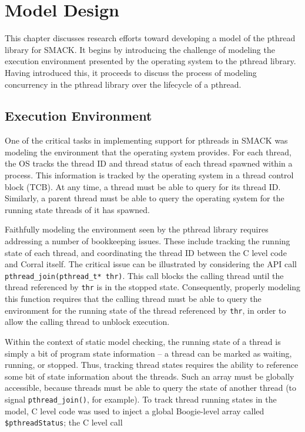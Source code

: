 \chapter{Model Design}\label{ch:modeldesign}
This chapter discusses research efforts toward developing a model of
the pthread library for SMACK.  It begins by introducing the challenge
of modeling the execution environment presented by the operating 
system to the pthread library.  Having introduced this, it proceeds to
discuss the process of modeling concurrency in the pthread library
over the lifecycle of a pthread. 

\section{Execution Environment}\label{sec:executionenvironment}
One of the critical tasks in implementing support for pthreads in
SMACK was modeling the environment that the operating system provides.
For each thread, the OS tracks the thread ID and thread status of
each thread spawned within a process.  This information is tracked by
the operating system in a thread control block (TCB).  At any time, a
thread must be able to query for its thread ID.  Similarly, a 
parent thread must be able to query the operating system for the
running state threads of it has spawned.

Faithfully modeling the environment seen by the pthread library
requires addressing a number of bookkeeping issues.  These include
tracking the running state of each thread, and coordinating the thread
ID between the C level code and Corral itself.  The critical issue can
be illustrated by considering the API call
\lstinline|pthread_join(pthread_t* thr)|. This call blocks the calling
thread until the thread referenced by \lstinline|thr| is in the stopped
state.  Consequently, properly modeling this function requires that the
calling thread must be able to query the environment for the running
state of the thread referenced by \lstinline|thr|, in order to allow
the calling thread to unblock execution.

Within the context of static model checking, the running state of a
thread is simply a bit of program state information -- a thread can be
marked as waiting, running, or stopped. Thus, tracking thread states
requires the ability to reference some bit of state information about
the threads. Such an array must be globally accessible, because threads
must be able to query the state of another thread (to signal
\lstinline|pthread_join()|, for example).  To track thread running
states in the model, C level code was used to inject a global
Boogie-level array called \lstinline|$pthreadStatus|; the C level call   

